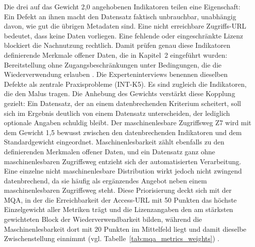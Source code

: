 Die drei auf das Gewicht 2,0 angehobenen Indikatoren teilen eine Eigenschaft: Ein Defekt an ihnen macht den Datensatz faktisch unbrauchbar, unabhängig davon, wie gut die übrigen Metadaten sind. Eine nicht erreichbare Zugriffs-URL bedeutet, dass keine Daten vorliegen. Eine fehlende oder eingeschränkte Lizenz blockiert die Nachnutzung rechtlich. Damit prüfen genau diese Indikatoren definierende Merkmale offener Daten, die in Kapitel~2 eingeführt wurden: Bereitstellung ohne Zugangsbeschränkungen unter Bedingungen, die die Wiederverwendung erlauben \cite{Ubaldi2013OGD, OECD2020OURdata}. Die Experteninterviews benennen dieselben Defekte als zentrale Praxisprobleme (INT-K5). Es sind zugleich die Indikatoren, die den Malus tragen. Die Anhebung des Gewichts verstärkt diese Kopplung gezielt: Ein Datensatz, der an einem datenbrechenden Kriterium scheitert, soll sich im Ergebnis deutlich von einem Datensatz unterscheiden, der lediglich optionale Angaben schuldig bleibt. Der maschinenlesbare Zugriffsweg Z7 wird mit dem Gewicht 1,5 bewusst zwischen den datenbrechenden Indikatoren und dem Standardgewicht eingeordnet. Maschinenlesbarkeit zählt ebenfalls zu den definierenden Merkmalen offener Daten, und ein Datensatz ganz ohne maschinenlesbaren Zugriffsweg entzieht sich der automatisierten Verarbeitung. Eine einzelne nicht maschinenlesbare Distribution wirkt jedoch nicht zwingend datenbrechend, da sie häufig als ergänzendes Angebot neben einem maschinenlesbaren Zugriffsweg steht. Diese Priorisierung deckt sich mit der MQA, in der die Erreichbarkeit der Access-URL mit 50 Punkten das höchste Einzelgewicht aller Metriken trägt und die Lizenzangaben den am stärksten gewichteten Block der Wiederverwendbarkeit bilden, während die Maschinenlesbarkeit dort mit 20 Punkten im Mittelfeld liegt und damit dieselbe Zwischenstellung einnimmt (vgl. Tabelle~\ref{tab:mqa_metrics_weights}) \cite{data_europa}.

